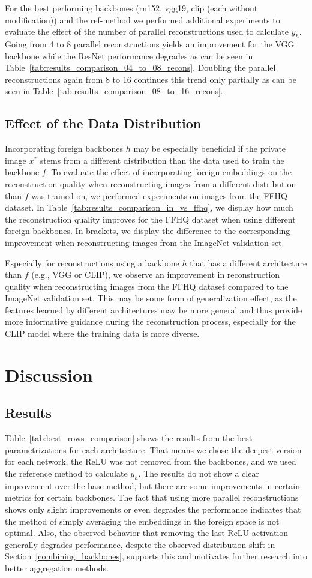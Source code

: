 \documentclass[10pt,twocolumn]{article}
\begin{document}
For the best performing backbones (rn152, vgg19, clip (each without modification)) and the ref-method we performed additional experiments to evaluate the effect of the number of parallel reconstructions used to calculate $y_h$.
Going from 4 to 8 parallel reconstructions yields an improvement for the VGG backbone while the ResNet performance degrades as can be seen in Table~\ref{tab:results_comparison_04_to_08_recons}.
Doubling the parallel reconstructions again from 8 to 16 continues this trend only partially as can be seen in Table~\ref{tab:results_comparison_08_to_16_recons}.

\subsection{Effect of the Data Distribution}
Incorporating foreign backbones $h$ may be especially beneficial if the private image $x^*$ stems from a different distribution than the data used to train the backbone $f$.
To evaluate the effect of incorporating foreign embeddings on the reconstruction quality when reconstructing images from a different distribution than $f$ was trained on, we performed experiments on images from the FFHQ dataset.
In Table~\ref{tab:results_comparison_in_vs_ffhq}, we display how much the reconstruction quality improves for the FFHQ dataset when using different foreign backbones.
In brackets, we display the difference to the corresponding improvement when reconstructing images from the ImageNet validation set.

Especially for reconstructions using a backbone $h$ that has a different architecture than $f$ (e.g., VGG or CLIP), we observe an improvement in reconstruction quality when reconstructing images from the FFHQ dataset compared to the ImageNet validation set.
This may be some form of generalization effect, as the features learned by different architectures may be more general and thus provide more informative guidance during the reconstruction process, especially for the CLIP model where the training data is more diverse.
\section{Discussion}
\subsection{Results}
Table~\ref{tab:best_rows_comparison} shows the results from the best parametrizations for each architecture.
That means we chose the deepest version for each network, the ReLU was not removed from the backbones, and we used the reference method to calculate $y_h$.
The results do not show a clear improvement over the base method, but there are some improvements in certain metrics for certain backbones.
The fact that using more parallel reconstructions shows only slight improvements or even degrades the performance indicates that the method of simply averaging the embeddings in the foreign space is not optimal.
Also, the observed behavior that removing the last ReLU activation generally degrades performance, despite the observed distribution shift in Section~\ref{combining_backbones}, supports this and motivates further research into better aggregation methods.
\end{document}
